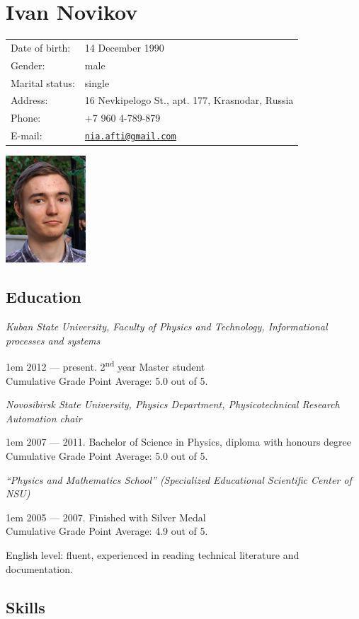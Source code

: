 \documentclass[a4paper, 12pt]{article}
\author{\theauthor}
\title{\thetitle}
\makeatletter
\newenvironment{fieldset}%
    {\begin{tabular}{ll}}%
    {\end{tabular}}
\newcommand{\field}[2]{ #1: & #2 \\ }
\newenvironment{indented}%
    { \begingroup %
        \noindent %
        \leftskip1em}%
    { \par\endgroup }
\newcommand{\education}[4]{
    \par\emph{#1}

    \begin{indented}
      #2. #3\\
      Cumulative Grade Point Average: #4 out of 5.
    \end{indented}
    \vspace{1mm} %
  }
\newcommand{\theauthor}{Ivan Novikov}
\newcommand{\themail}{nia.afti@gmail.com}
\makeatother
\begin{document}
  \begin{minipage}[h]{0.8\linewidth}
    \section*{\theauthor}

    \begin{fieldset}
      \field{Date of birth} {14 December 1990}
      \field{Gender}        {male}
      \field{Marital status}{single}
      \field{Address}       {16 Nevkipelogo St., apt. 177, Krasnodar, Russia}
      \field{Phone}         {+7 960 4-789-879}
      \field{E-mail}        {\href{mailto:\themail}{\nolinkurl{\themail}}}
    \end{fieldset}
  \end{minipage}
  \begin{minipage}[h]{0.19\linewidth}
    \includegraphics[width=3cm]{photo}
  \end{minipage}

  \subsection*{Education}

  \education{Kuban State University, Faculty of Physics and Technology, Informational processes and systems}
            {2012 — present}{2\textsuperscript{nd} year Master student}{5.0}
  \education{Novosibirsk State University, Physics Department, Physicotechnical Research Automation chair}
            {2007 — 2011}{Bachelor of Science in Physics, diploma with honours degree}{5.0}
  \education{``Physics and Mathematics School'' (Specialized Educational Scientific Center of NSU)}
            {2005 — 2007}{Finished with Silver Medal}{4.9}

  English level: fluent, experienced in reading technical literature and documentation.

  \subsection*{Skills}
\end{document}
